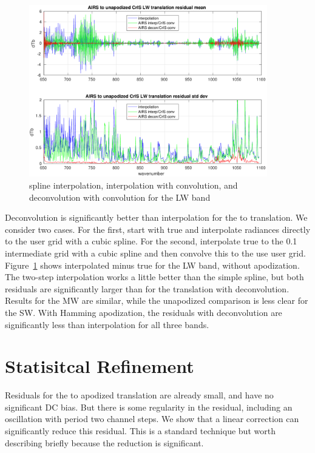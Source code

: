 \documentclass[11pt]{article}
\begin{document}
\begin{figure} %
  \centering
  \includegraphics[height=7.5cm]{figures/a2cris_interp_LW.pdf}
  \caption{spline interpolation, interpolation with convolution, 
    and deconvolution with convolution for the {\cris} LW band}
  \label{intpLW}
\end{figure}

Deconvolution is significantly better than interpolation for the
{\airs} to {\cris} translation.  We consider two cases.  For the
first, start with true {\airs} and interpolate radiances directly 
to the {\cris} user grid with a cubic spline.  For the second,
interpolate true {\airs} to the 0.1 {\wn} intermediate grid with a
cubic spline and then convolve this to the use {\cris} user grid.
Figure~\ref{intpLW} shows interpolated {\cris} minus true {\cris}
for the LW band, without apodization.  The two-step interpolation
works a little better than the simple spline, but both residuals are
significantly larger than for the translation with deconvolution.
Results for the MW are similar, while the unapodized comparison is
less clear for the SW.  With Hamming apodization, the residuals with
deconvolution are significantly less than interpolation for all
three bands.

\FloatBarrier
\section{Statisitcal Refinement}
\label{statfix}

Residuals for the {\airs} to apodized {\cris} translation are
already small, and have no significant DC bias.  But there is some
regularity in the residual, including an oscillation with period two
channel steps.  We show that a linear correction can significantly
reduce this residual.  This is a standard technique but worth
describing briefly because the reduction is significant.
\end{document}
